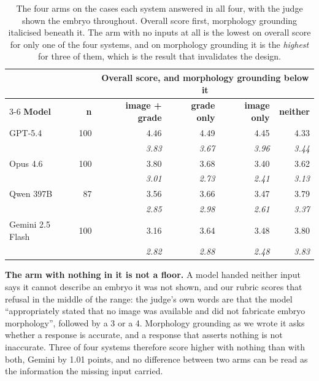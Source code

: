 \begin{table}[H]
\centering
\small
\begin{tabular}{lrrrrr}
\toprule
& & \multicolumn{4}{c}{\textbf{Overall score, and morphology grounding below it}} \\
\cmidrule(lr){3-6}
\textbf{Model} & \textbf{n} & \textbf{image + grade} & \textbf{grade only} &
\textbf{image only} & \textbf{neither} \\
\midrule
GPT-5.4          & 100 & 4.46 & 4.49 & 4.45 & 4.33 \\
                 &     & \emph{3.83} & \emph{3.67} & \emph{3.96} & \emph{3.44} \\
Opus 4.6         & 100 & 3.80 & 3.68 & 3.40 & 3.62 \\
                 &     & \emph{3.01} & \emph{2.73} & \emph{2.41} & \emph{3.13} \\
Qwen 397B        &  87 & 3.56 & 3.66 & 3.47 & 3.79 \\
                 &     & \emph{2.85} & \emph{2.98} & \emph{2.61} & \emph{3.37} \\
Gemini 2.5 Flash & 100 & 3.16 & 3.64 & 3.48 & 3.80 \\
                 &     & \emph{2.82} & \emph{2.88} & \emph{2.48} & \emph{3.83} \\
\bottomrule
\end{tabular}
\caption{The four arms on the cases each system answered in all four, with the
judge shown the embryo throughout. Overall score first, morphology grounding
italicised beneath it. The arm with no inputs at all is the lowest on overall
score for only one of the four systems, and on morphology grounding it is the
\emph{highest} for three of them, which is the result that invalidates the
design.}
\label{tab:ablation}
\end{table}

\textbf{The arm with nothing in it is not a floor.} A model handed neither input
says it cannot describe an embryo it was not shown, and our rubric scores that
refusal in the middle of the range: the judge's own words are that the model
``appropriately stated that no image was available and did not fabricate embryo
morphology'', followed by a 3 or a 4. Morphology grounding as we wrote it asks
whether a response is accurate, and a response that asserts nothing is not
inaccurate. Three of four systems therefore score higher with nothing than with
both, Gemini by 1.01 points, and no difference between two arms can be read as
the information the missing input carried.


